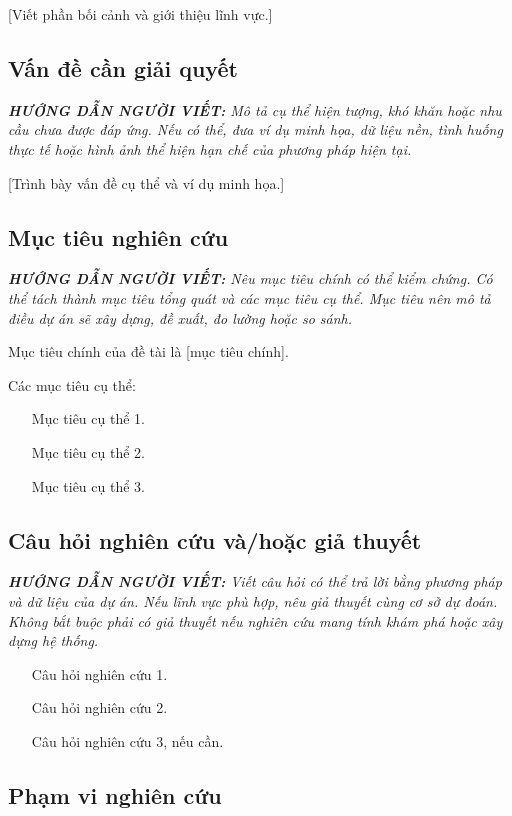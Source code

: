 \documentclass[12pt,a4paper]{report}
\newcommand{\huongdan}[1]{%
  \par\smallskip\noindent
  \textit{\textbf{HƯỚNG DẪN NGƯỜI VIẾT:} #1}%
  \par\smallskip}
\begin{document}
[Viết phần bối cảnh và giới thiệu lĩnh vực.]

\subsection{Vấn đề cần giải quyết}

\huongdan{Mô tả cụ thể hiện tượng, khó khăn hoặc nhu cầu chưa được đáp ứng.
Nếu có thể, đưa ví dụ minh họa, dữ liệu nền, tình huống thực tế hoặc hình
ảnh thể hiện hạn chế của phương pháp hiện tại.}

[Trình bày vấn đề cụ thể và ví dụ minh họa.]

\subsection{Mục tiêu nghiên cứu}

\huongdan{Nêu mục tiêu chính có thể kiểm chứng. Có thể tách thành mục tiêu
tổng quát và các mục tiêu cụ thể. Mục tiêu nên mô tả điều dự án sẽ xây dựng,
đề xuất, đo lường hoặc so sánh.}

Mục tiêu chính của đề tài là [mục tiêu chính].

Các mục tiêu cụ thể:
\begin{itemize}
  \item [Mục tiêu cụ thể 1.]
  \item [Mục tiêu cụ thể 2.]
  \item [Mục tiêu cụ thể 3.]
\end{itemize}

\subsection{Câu hỏi nghiên cứu và/hoặc giả thuyết}

\huongdan{Viết câu hỏi có thể trả lời bằng phương pháp và dữ liệu của dự án.
Nếu lĩnh vực phù hợp, nêu giả thuyết cùng cơ sở dự đoán. Không bắt buộc
phải có giả thuyết nếu nghiên cứu mang tính khám phá hoặc xây dựng hệ thống.}

\begin{enumerate}
  \item [Câu hỏi nghiên cứu 1.]
  \item [Câu hỏi nghiên cứu 2.]
  \item [Câu hỏi nghiên cứu 3, nếu cần.]
\end{enumerate}

\subsection{Phạm vi nghiên cứu}
\end{document}
